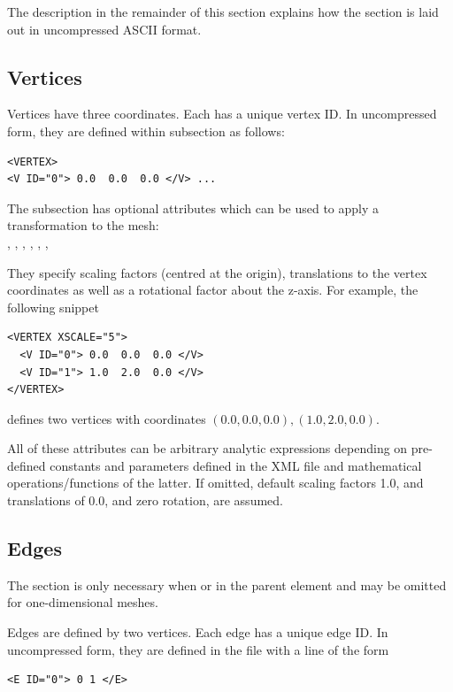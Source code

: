 \begin{notebox}
The description in the remainder of this section explains how the  section is laid out in uncompressed ASCII format.
\end{notebox}


\subsection{Vertices}

Vertices have three coordinates. Each has a unique vertex ID. In
uncompressed form, they are defined within  subsection as follows:
\begin{lstlisting}[style=XMLStyle] <VERTEX>
<V ID="0"> 0.0  0.0  0.0 </V> ...
\end{lstlisting}
The  subsection has optional attributes which can be used to
apply a transformation to the mesh:\\
, , ,
, , , 

They specify scaling factors (centred at the origin), translations to
the vertex coordinates as well as a rotational factor about the
z-axis. For example, the following snippet
\begin{lstlisting}[style=XMLStyle]
<VERTEX XSCALE="5">
  <V ID="0"> 0.0  0.0  0.0 </V>
  <V ID="1"> 1.0  2.0  0.0 </V>
</VERTEX>
\end{lstlisting}
defines two vertices with coordinates $(0.0,0.0,0.0), (1.0,2.0,0.0)$.

All of these attributes can be arbitrary analytic expressions depending on pre-
defined constants and parameters defined in the XML file and
mathematical operations/functions of the latter. If omitted, default scaling
factors 1.0, and translations of 0.0, and zero rotation,  are assumed.



\subsection{Edges}
\begin{tipbox}
    The  section is only necessary when  or
     in the parent  element and may be omitted for
    one-dimensional meshes.
\end{tipbox}

Edges are defined by two vertices. Each edge has a unique edge ID. In
uncompressed form, they are defined in the file with a line of the form
\begin{lstlisting}[style=XMLStyle]
<E ID="0"> 0 1 </E>
\end{lstlisting}


